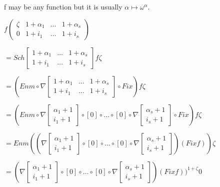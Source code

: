\documentclass[10pt]{article}
\begin{document}
f may be any function but it is usually \( \alpha \mapsto \omega^\alpha \).

\( f \begin{pmatrix} \zeta & 1+\alpha_1 & \ldots & 1+\alpha_s \\
                     0     & 1+i_1      & \ldots & 1+i_s      \end{pmatrix} \)

\( = Sch \begin{bmatrix} 1+\alpha_1 & \ldots & 1+\alpha_s \\
                      1+i_1      & \ldots & 1+i_s      \end{bmatrix} f \zeta \)

\( = (Enm \circ \nabla \begin{bmatrix} 1+\alpha_1 & \ldots & 1+\alpha_s \\
                                       1+i_1      & \ldots & 1+i_s      \end{bmatrix} \circ Fix) f \zeta \)

\( = (Enm \circ \nabla \begin{bmatrix} \alpha_1+1 \\
                                       i_1+1      \end{bmatrix} \circ [0] \circ \ldots \circ [0] \circ \nabla \begin{bmatrix} \alpha_s+1 \\
                                                                                                                              i_s+1      \end{bmatrix} \circ Fix) f \zeta \)

\( = Enm ((\nabla \begin{bmatrix} \alpha_1+1 \\
                                  i_1+1      \end{bmatrix} \circ [0] \circ \ldots \circ [0] \circ \nabla \begin{bmatrix} \alpha_s+1 \\
                                                                                                                         i_s+1      \end{bmatrix}) (Fix f)) \zeta \)

\( = (\nabla \begin{bmatrix} \alpha_1+1 \\
                             i_1+1      \end{bmatrix} \circ [0] \circ \ldots \circ [0] \circ \nabla \begin{bmatrix} \alpha_s+1 \\
                                                                                                                    i_s+1      \end{bmatrix}) (Fix f))^{1+\zeta} 0 \)
\end{document}
